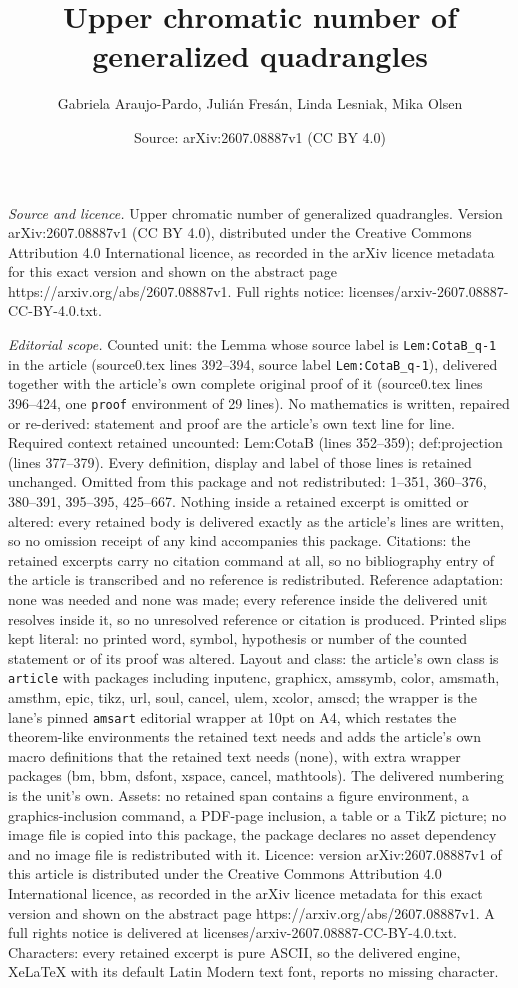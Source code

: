 \documentclass[10pt,a4paper]{amsart}
\title[Upper chromatic number of generalized quadrangles]{Upper chromatic number of generalized quadrangles}
\author{Gabriela Araujo-Pardo, Juli\'an Fres\'an, Linda Lesniak, Mika Olsen}
\date{Source: arXiv:2607.08887v1 (CC BY 4.0)}
\begin{document}
\maketitle

\noindent\emph{Source and licence.} Upper chromatic number of generalized quadrangles. Version arXiv:2607.08887v1 (CC BY 4.0), distributed under the Creative Commons Attribution 4.0 International licence, as recorded in the arXiv licence metadata for this exact version and shown on the abstract page https://arxiv.org/abs/2607.08887v1. Full rights notice: licenses/arxiv-2607.08887-CC-BY-4.0.txt.\par\smallskip

\noindent\textit{Editorial scope.} Counted unit: the Lemma whose source label is \texttt{Lem:CotaB\_q-1} in the article (source0.tex lines 392--394, source label \texttt{Lem:CotaB\_q-1}), delivered together with the article's own complete original proof of it (source0.tex lines 396--424, one \texttt{proof} environment of 29 lines). No mathematics is written, repaired or re-derived: statement and proof are the article's own text line for line. Required context retained uncounted: Lem:CotaB (lines 352--359); def:projection (lines 377--379). Every definition, display and label of those lines is retained unchanged. Omitted from this package and not redistributed: 1--351, 360--376, 380--391, 395--395, 425--667. Nothing inside a retained excerpt is omitted or altered: every retained body is delivered exactly as the article's lines are written, so no omission receipt of any kind accompanies this package. Citations: the retained excerpts carry no citation command at all, so no bibliography entry of the article is transcribed and no reference is redistributed. Reference adaptation: none was needed and none was made; every reference inside the delivered unit resolves inside it, so no unresolved reference or citation is produced. Printed slips kept literal: no printed word, symbol, hypothesis or number of the counted statement or of its proof was altered. Layout and class: the article's own class is \texttt{article} with packages including inputenc, graphicx, amssymb, color, amsmath, amsthm, epic, tikz, url, soul, cancel, ulem, xcolor, amscd; the wrapper is the lane's pinned \texttt{amsart} editorial wrapper at 10pt on A4, which restates the theorem-like environments the retained text needs and adds the article's own macro definitions that the retained text needs (none), with extra wrapper packages (bm, bbm, dsfont, xspace, cancel, mathtools). The delivered numbering is the unit's own. Assets: no retained span contains a figure environment, a graphics-inclusion command, a PDF-page inclusion, a table or a TikZ picture; no image file is copied into this package, the package declares no asset dependency and no image file is redistributed with it. Licence: version arXiv:2607.08887v1 of this article is distributed under the Creative Commons Attribution 4.0 International licence, as recorded in the arXiv licence metadata for this exact version and shown on the abstract page https://arxiv.org/abs/2607.08887v1. A full rights notice is delivered at licenses/arxiv-2607.08887-CC-BY-4.0.txt. Characters: every retained excerpt is pure ASCII, so the delivered engine, XeLaTeX with its default Latin Modern text font, reports no missing character.
\end{document}

